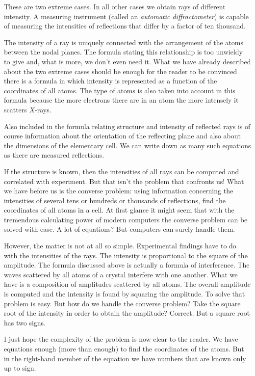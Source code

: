 These are two extreme cases. In all other cases we obtain rays of different intensity. A measuring instrument (called an \emph{automatic diffractometer}) is capable of measur­ing the intensities of reflections that differ by a factor of ten thousand.

The intensity of a ray is uniquely connected with the arrangement of the atoms between the nodal planes. The formula stating this relationship is too unwieldy to give and, what is more, we don't even need it. What we have already described about the two extreme cases should be enough for the reader to be convinced there is a for­mula in which intensity is represented as a function of the coordinates of all atoms. The type of atoms is also taken into account in this formula because the more electrons there are in an atom the more intensely it scatters $X$-rays.

Also included in the formula relating structure and intensity of reflected rays is of course information about the orientation of the reflecting plane and also about the dimensions of the elementary cell. We can write down as many such equations as there are measured reflections.

If the structure is known, then the intensities of all rays can be computed and correlated with experiment. But that isn't the problem that confronts us! What we have before us is the converse problem: using information concerning the intensities of several tens or hundreds or thousands of reflections, find the coordinates of all atoms in a cell. At first glance it might seem that with the tremendous calculating power of modern computers the converse problem can be solved with ease. A lot of equations? But computers can surely handle them.

However, the matter is not at all so simple. Experimen­tal findings have to do with the intensities of the rays. The intensity is proportional to the square of the ampli­tude. The formula discussed above is actually a formula of interference. The waves scattered by all atoms of a crystal interfere with one another. What we have is a composition of amplitudes scattered by all atoms. The overall amplitude is computed and the intensity is found by squaring the amplitude. To solve that problem is easy. But how do we handle the converse problem? Take the square root of the intensity in order to obtain the am­plitude? Correct. But a square root has two signs.

I just hope the complexity of the problem is now clear to the reader. We have equations enough (more than enough) to find the coordinates of the atoms. But in the right-hand member of the equation we have numbers that are known only up to sign.

